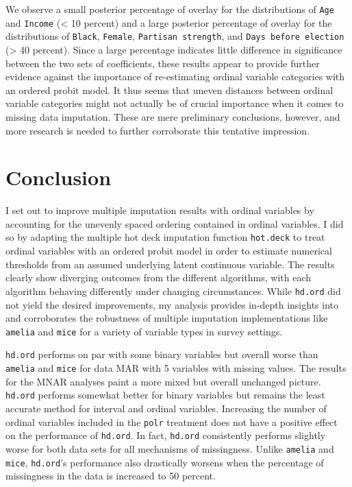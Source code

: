 \documentclass[12pt,econ]{sources/authesis}
\begin{document}
We observe a small posterior percentage of overlay for the distributions of \texttt{Age} and \texttt{Income} (\textless{} 10 percent) and a large posterior percentage of overlay for the distributions of \texttt{Black}, \texttt{Female}, \texttt{Partisan\ strength}, and \texttt{Days\ before\ election} (\textgreater{} 40 percent). Since a large percentage indicates little difference in significance between the two sets of coefficients, these results appear to provide further evidence against the importance of re-estimating ordinal variable categories with an ordered probit model. It thus seems that uneven distances between ordinal variable categories might not actually be of crucial importance when it comes to missing data imputation. These are mere preliminary conclusions, however, and more research is needed to further corroborate this tentative impression.

\hypertarget{ordmiss-conclusion}{%
\section{Conclusion}\label{ordmiss-conclusion}}

I set out to improve multiple imputation results with ordinal variables by accounting for the unevenly spaced ordering contained in ordinal variables. I did so by adapting the multiple hot deck imputation function \texttt{hot.deck} to treat ordinal variables with an ordered probit model in order to estimate numerical thresholds from an assumed underlying latent continuous variable. The results clearly show diverging outcomes from the different algorithms, with each algorithm behaving differently under changing circumstances. While \texttt{hd.ord} did not yield the desired improvements, my analysis provides in-depth insights into and corroborates the robustness of multiple imputation implementations like \texttt{amelia} and \texttt{mice} for a variety of variable types in survey settings.

\texttt{hd.ord} performs on par with some binary variables but overall worse than \texttt{amelia} and \texttt{mice} for data MAR with 5 variables with missing values. The results for the MNAR analyses paint a more mixed but overall unchanged picture. \texttt{hd.ord} performs somewhat better for binary variables but remains the least accurate method for interval and ordinal variables. Increasing the number of ordinal variables included in the \texttt{polr} treatment does not have a positive effect on the performance of \texttt{hd.ord}. In fact, \texttt{hd.ord} consistently performs slightly worse for both data sets for all mechanisms of missingness. Unlike \texttt{amelia} and \texttt{mice}, \texttt{hd.ord}'s performance also drastically worsens when the percentage of missingness in the data is increased to 50 percent.
\end{document}
